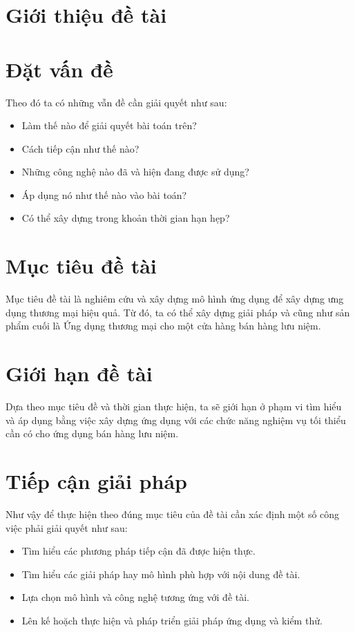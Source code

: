 \section{Giới thiệu đề tài}
\section{Đặt vấn đề}
Theo đó ta có những vẫn đề cần giải quyết như sau:
\begin{itemize}
    \item Làm thế nào để giải quyết bài toán trên?
    \item Cách tiếp cận như thế nào?
    \item Những công nghệ nào đã và hiện đang được sử dụng?
    \item Áp dụng nó như thế nào vào bài toán?
    \item Có thể xây dựng trong khoản thời gian hạn hẹp?
\end{itemize}

\section{Mục tiêu đề tài}
Mục tiêu đề tài là nghiêm cứu và xây dựng mô hình ứng dụng để xây dựng ưng dụng thương mại hiệu quả. Từ đó, ta có thể xây dựng giải pháp và cũng như sản phẩm cuối là Ứng dụng thương mại cho một cửa hàng bán hàng lưu niệm.

\section{Giới hạn đề tài}
Dựa theo mục tiêu đề và thời gian thực hiện, ta sẽ giới hạn ở phạm vi tìm hiểu và áp dụng bằng việc xây dựng ứng dụng với các chức năng nghiệm vụ tối thiểu cần có cho ứng dụng bán hàng lưu niệm.

\section{Tiếp cận giải pháp}
Như vậy để thực hiện theo đúng mục tiêu của đề tài cần xác định một số công việc phải giải
quyết như sau:
\begin{itemize}
    \item Tìm hiểu các phương pháp tiếp cận đã được hiện thực.
    \item Tìm hiểu các giải pháp hay mô hình phù hợp với nội dung đề tài.
    \item Lựa chọn mô hình và công nghệ tương ứng với đề tài.
    \item Lên kế hoặch thực hiện và pháp triển giải pháp ứng dụng và kiểm thử.
\end{itemize}


